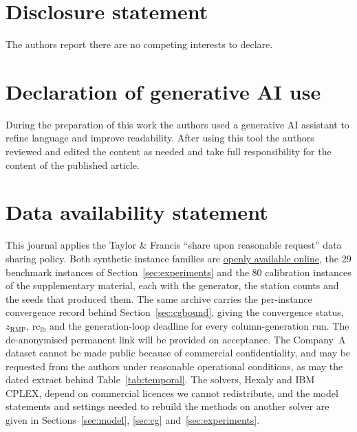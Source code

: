 \documentclass[]{interact}
\begin{document}
\section*{Disclosure statement}
The authors report there are no competing interests to declare.

\section*{Declaration of generative AI use}
During the preparation of this work the authors used a generative AI assistant to refine language and improve readability. After using this tool the authors reviewed and edited the content as needed and take full responsibility for the content of the published article.

\section*{Data availability statement}
This journal applies the Taylor \& Francis ``share upon reasonable request'' data sharing policy. Both synthetic instance families are \href{https://anonymous.4open.science/r/Anonymized_Export_CSLAP_v2-01BC/README.md}{openly available online}, the 29 benchmark instances of Section~\ref{sec:experiments} and the 80 calibration instances of the supplementary material, each with the generator, the station counts and the seeds that produced them. The same archive carries the per-instance convergence record behind Section~\ref{sec:cgbound}, giving the convergence status, $z_{\mathrm{RMP}}$, $\mathrm{rc}_{\mathrm{lb}}$ and the generation-loop deadline for every column-generation run. The de-anonymised permanent link will be provided on acceptance. The Company~A dataset cannot be made public because of commercial confidentiality, and may be requested from the authors under reasonable operational conditions, as may the dated extract behind Table~\ref{tab:temporal}. The solvers, Hexaly and IBM CPLEX, depend on commercial licences we cannot redistribute, and the model statements and settings needed to rebuild the methods on another solver are given in Sections~\ref{sec:model}, \ref{sec:cg} and~\ref{sec:experiments}.





\appendix
\end{document}
